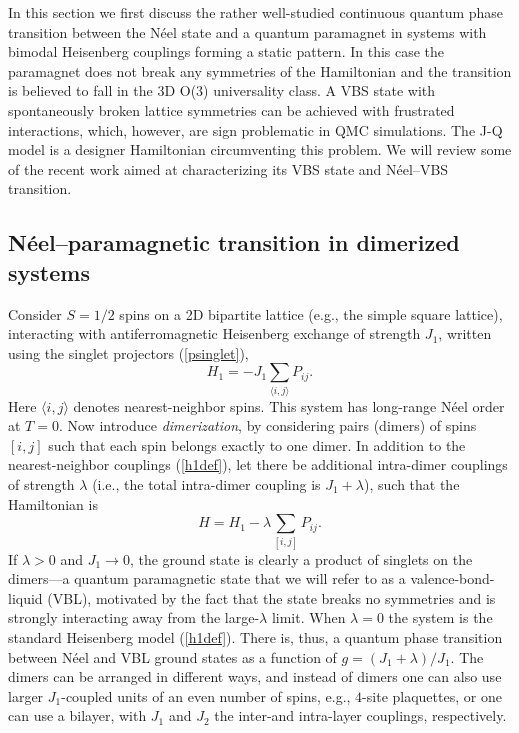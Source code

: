 \documentclass[10pt,pre,aps,twocolumn,showpacs,superscriptaddress,floatfix]{revtex4-1}
\begin{document}
In this section we first discuss the rather well-studied continuous quantum phase transition between the N\'eel state and a quantum paramagnet in systems 
with bimodal Heisenberg couplings forming a static pattern. In this case the paramagnet does not break any symmetries of the Hamiltonian and the transition 
is believed to fall in the 3D O($3$) universality class. A VBS state with spontaneously broken lattice symmetries can be achieved with frustrated 
interactions, which, however, are sign problematic in QMC simulations. The J-Q model \cite{Sandvik07} is a designer Hamiltonian circumventing this 
problem. We will review some of the recent work aimed at characterizing its VBS state and  N\'eel--VBS transition.

\subsection{N\'eel--paramagnetic transition in dimerized systems}
\label{sec:dimermodels}

Consider $S=1/2$ spins on a 2D bipartite lattice (e.g., the simple square lattice), interacting with antiferromagnetic Heisenberg exchange of 
strength $J_1$, written using the singlet projectors (\ref{psinglet}),
\begin{equation}
H_1 = -J_1 \sum_{\langle i,j\rangle} P_{ij}.
\label{h1def}
\end{equation}
Here $\langle i,j\rangle$ denotes nearest-neighbor spins. This system has long-range N\'eel order at $T=0$. Now introduce {\it dimerization}, 
by considering pairs (dimers) of spins $[i,j]$ such that each spin belongs exactly to one dimer. In addition to the nearest-neighbor couplings (\ref{h1def}),
let there be additional intra-dimer couplings of strength $\lambda$ (i.e., the total intra-dimer coupling is $J_1+\lambda$), such that the Hamiltonian is
\begin{equation}
H = H_1  -\lambda \sum_{[ i,j]} P_{ij} .
\end{equation}
If $\lambda>0$ and $J_1\to 0$, the ground state is clearly a product of singlets on the dimers---a quantum paramagnetic state that we will refer
to as a valence-bond-liquid (VBL), motivated by the fact that the state breaks no symmetries and is strongly interacting away from the large-$\lambda$
limit. When $\lambda=0$  the system is the standard Heisenberg model (\ref{h1def}). There is, thus, a quantum phase transition between N\'eel and VBL ground 
states as a function of $g=(J_1+\lambda)/J_1$. The dimers can be arranged in different ways, and instead of dimers one can also use larger $J_1$-coupled 
units of an even number of spins, e.g., $4$-site plaquettes, or one can use a bilayer, with $J_1$ and $J_2$ the inter-and intra-layer couplings, respectively.
\end{document}
